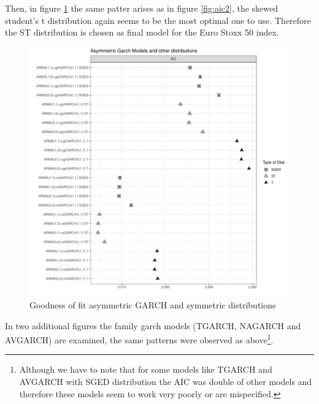 \documentclass[a4paper, twoside]{templates/ociamthesis}
\newcommand*{\bibtitle}{Works Cited}
\begin{document}
\noindent Then, in figure \ref{fig:aic4} the same patter arises as in figure \ref{fig:aic2}, the skewed student's t distribution again seems to be the most optimal one to use. Therefore the ST distribution is chosen as final model for the Euro Stoxx 50 index.

\begin{figure}[h]

{\centering \includegraphics[width=0.9\linewidth]{figures/aicfigures/asymmetric aics2} 

}

\caption{Goodness of fit asymmetric GARCH and symmetric distributions}\label{fig:aic4}
\end{figure}

\noindent In two additional figures the family garch models (TGARCH, NAGARCH and AVGARCH) are examined, the same patterns were observed as above\footnote{Although we have to note that for some models like TGARCH and AVGARCH with SGED distribution the AIC was double of other models and therefore these models seem to work very poorly or are mispecified.}.




\setlength{\baselineskip}{0pt} %

{\renewcommand*\MakeUppercase[1]{#1}%
\printbibliography[heading=bibintoc,title={\bibtitle}]}
\end{document}
